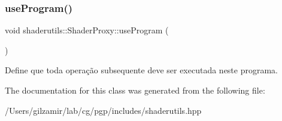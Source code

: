 \subsubsection{\texorpdfstring{use\+Program()}{useProgram()}}
{\footnotesize\ttfamily void shaderutils\+::\+Shader\+Proxy\+::use\+Program (\begin{DoxyParamCaption}{ }\end{DoxyParamCaption})\hspace{0.3cm}{\ttfamily [inline]}}

Define que toda operação subsequente deve ser executada neste programa. 

The documentation for this class was generated from the following file\+:\begin{DoxyCompactItemize}
\item 
/\+Users/gilzamir/lab/cg/pgp/includes/shaderutils.\+hpp\end{DoxyCompactItemize}
